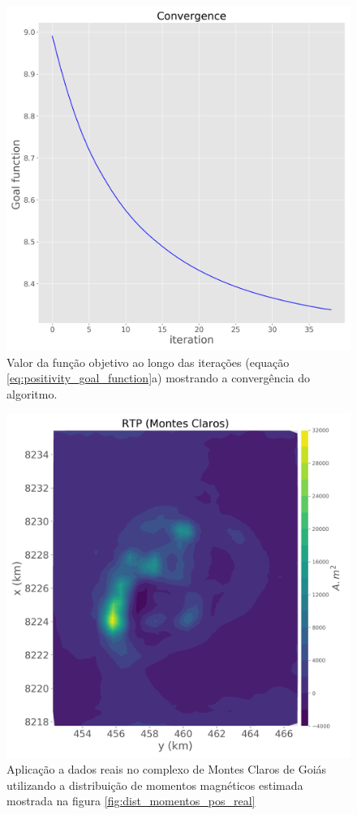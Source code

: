 \begin{figure}
	\centering
	\includegraphics[width=.9\textwidth]{Fig/eqlayer/field_data_montes_claros/convergence_LM_NNLS_montesclaros.png}
	\caption{Valor da função objetivo ao longo das iterações (equação \ref{eq:positivity_goal_function}a) mostrando a convergência do algoritmo.}
	\label{fig:convergence_real}
\end{figure}

\begin{figure}
	\centering
	\includegraphics[width=.9\textwidth]{Fig/eqlayer/field_data_montes_claros/RTP_data_montes_claros.png}
	\caption{Aplicação a dados reais no complexo de Montes Claros de Goiás utilizando a distribuição de momentos magnéticos estimada mostrada na figura \ref{fig:dist_momentos_pos_real}}
	\label{fig:rtp_mc_data}
\end{figure}

